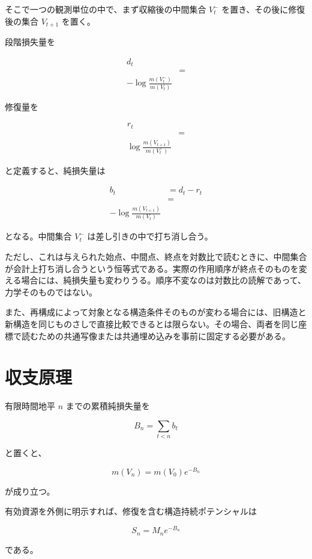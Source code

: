 \documentclass[12pt,a4paper]{article}
\begin{document}
そこで一つの観測単位の中で、まず収縮後の中間集合 \(V_{t}^-\) を置き、その後に修復後の集合 \(V_{t+1}\) を置く。

段階損失量を

\[
\begin{aligned}
d_{t} \\
&= \\
-\log\frac{m(V_{t}^-)}{m(V_{t})}
\end{aligned}
\]

修復量を

\[
\begin{aligned}
r_{t} \\
&= \\
\log\frac{m(V_{t+1})}{m(V_{t}^-)}
\end{aligned}
\]

と定義すると、純損失量は

\[
\begin{aligned}
b_{t}&=d_{t}-r_{t} \\
&= \\
-\log\frac{m(V_{t+1})}{m(V_{t})}
\end{aligned}
\]

となる。中間集合 \(V_{t}^-\) は差し引きの中で打ち消し合う。

ただし、これは与えられた始点、中間点、終点を対数比で読むときに、中間集合が会計上打ち消し合うという恒等式である。実際の作用順序が終点そのものを変える場合には、純損失量も変わりうる。順序不変なのは対数比の読解であって、力学そのものではない。

また、再構成によって対象となる構造条件そのものが変わる場合には、旧構造と新構造を同じものさしで直接比較できるとは限らない。その場合、両者を同じ座標で読むための共通写像または共通埋め込みを事前に固定する必要がある。

\section{収支原理}\label{ux53ceux652fux539fux7406}

有限時間地平 \(n\) までの累積純損失量を

\[
B_{n}=\sum_{t<n} b_{t}
\]

と置くと、

\[
m(V_{n})=m(V_0)e^{-B_{n}}
\]

が成り立つ。

有効資源を外側に明示すれば、修復を含む構造持続ポテンシャルは

\[
S_{n}=M_{n} e^{-B_{n}}
\]

である。
\end{document}
